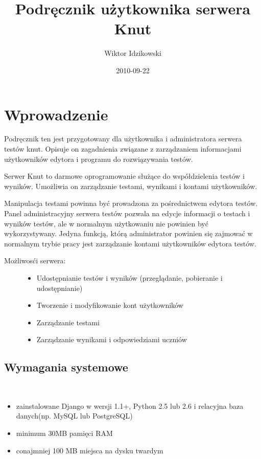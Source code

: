 \documentclass[letterpaper,10pt,polish]{sphinxmanual}
\title{Podręcznik użytkownika serwera Knut}
\date{2010-09-22}
\author{Wiktor Idzikowski}
\begin{document}
\maketitle
\tableofcontents
{}\label{index::doc}



\chapter{Wprowadzenie}
\label{index:id1}\label{index:witamy-w-podreczniku-uzytkownika-serwera-knut}\label{index:wprowadzenie}
Podręcznik ten jest przygotowany dla użytkownika i administratora serwera testów knut. Opisuje on zagadnienia związane z zarządzaniem informacjami  użytkowników edytora i programu do rozwiązywania testów.

Serwer Knut to darmowe oprogramowanie służące do współdzielenia testów i wyników.
Umożliwia on zarządzanie testami, wynikami i kontami użytkowników.

Manipulacja testami powinna być prowadzona za pośrednictwem edytora testów. Panel administracyjny serwera testów pozwala na edycje informacji o testach i wyników testów, ale w normalnym użytkowaniu nie powinien być wykorzystywany. Jedyna funkcją, którą administrator powinien się zajmować w normalnym trybie pracy jest zarządzanie kontami użytkowników edytora testów.
\begin{description}
\item[{Możliwosći serwera:}] \leavevmode\begin{itemize}
\item {} 
Udostępnianie testów i wyników (przeglądanie, pobieranie i udostępnianie)

\item {} 
Tworzenie i modyfikowanie kont użytkowników

\item {} 
Zarządzanie testami

\item {} 
Zarządzanie wynikami i odpowiedziami uczniów

\end{itemize}

\end{description}


\section{Wymagania systemowe}
\label{index:wymagania-systemowe}\label{index:id2}{\raggedright{}~}
\begin{itemize}
\item {} 
zainstalowane Django w wersji 1.1+, Python 2.5 lub 2.6 i relacyjna baza danych(np. MySQL lub PostgreSQL)

\item {} 
minimum 30MB pamięci RAM

\item {} 
conajmniej 100 MB miejsca na dysku twardym

\end{itemize}
{\raggedright{}~\\
~\\
~\\
~\\
~}
\end{document}
